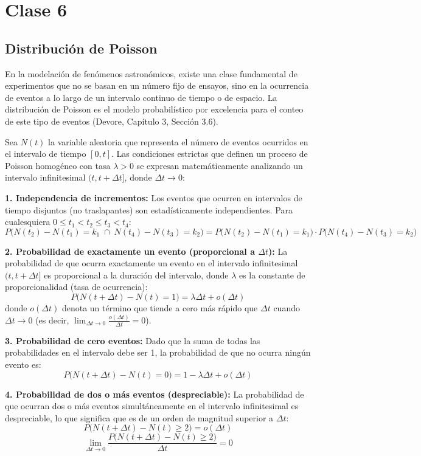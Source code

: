 \chapter{Clase 6}

\section{Distribución de Poisson}

En la modelación de fenómenos astronómicos, existe una clase fundamental de experimentos que no se basan en un número fijo de ensayos, sino en la ocurrencia de eventos a lo largo de un intervalo continuo de tiempo o de espacio. La distribución de Poisson es el modelo probabilístico por excelencia para el conteo de este tipo de eventos (Devore, Capítulo 3, Sección 3.6). 

Sea $N(t)$ la variable aleatoria que representa el número de eventos ocurridos en el intervalo de tiempo $[0, t]$. Las condiciones estrictas que definen un proceso de Poisson homogéneo con tasa $\lambda > 0$ se expresan matemáticamente analizando un intervalo infinitesimal $(t, t + \Delta t]$, donde $\Delta t \to 0$:

\textbf{1. Independencia de incrementos:}
Los eventos que ocurren en intervalos de tiempo disjuntos (no traslapantes) son estadísticamente independientes. Para cualesquiera $0 \le t_1 < t_2 \le t_3 < t_4$:
$$ P\Big(N(t_2) - N(t_1) = k_1 \;\cap\; N(t_4) - N(t_3) = k_2\Big) = P\Big(N(t_2) - N(t_1) = k_1\Big) \cdot P\Big(N(t_4) - N(t_3) = k_2\Big) $$

\textbf{2. Probabilidad de exactamente un evento (proporcional a $\Delta t$):}
La probabilidad de que ocurra exactamente un evento en el intervalo infinitesimal $(t, t + \Delta t]$ es proporcional a la duración del intervalo, donde $\lambda$ es la constante de proporcionalidad (tasa de ocurrencia):
$$ P\Big(N(t + \Delta t) - N(t) = 1\Big) = \lambda \Delta t + o(\Delta t) $$
donde $o(\Delta t)$ denota un término que tiende a cero más rápido que $\Delta t$ cuando $\Delta t \to 0$ (es decir, $\lim_{\Delta t \to 0} \frac{o(\Delta t)}{\Delta t} = 0$).

\textbf{3. Probabilidad de cero eventos:}
Dado que la suma de todas las probabilidades en el intervalo debe ser 1, la probabilidad de que no ocurra ningún evento es:
$$ P\Big(N(t + \Delta t) - N(t) = 0\Big) = 1 - \lambda \Delta t + o(\Delta t) $$

\textbf{4. Probabilidad de dos o más eventos (despreciable):}
La probabilidad de que ocurran dos o más eventos simultáneamente en el intervalo infinitesimal es despreciable, lo que significa que es de un orden de magnitud superior a $\Delta t$:
$$ P\Big(N(t + \Delta t) - N(t) \ge 2\Big) = o(\Delta t) $$
$$ \lim_{\Delta t \to 0} \frac{P\Big(N(t + \Delta t) - N(t) \ge 2\Big)}{\Delta t} = 0 $$

